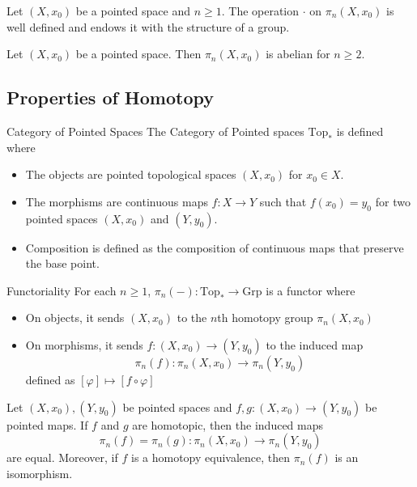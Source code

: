 \documentclass[a4paper]{article}
\begin{document}
\begin{thm}{}{} Let $(X,x_0)$ be a pointed space and $n\geq 1$. The operation $\cdot$ on $\pi_n(X,x_0)$ is well defined and endows it with the structure of a group. 
\end{thm}

\begin{prp}{}{} Let $(X,x_0)$ be a pointed space. Then $\pi_n(X,x_0)$ is abelian for $n\geq 2$. 
\end{prp}

\subsection{Properties of Homotopy}
\begin{defn}{Category of Pointed Spaces}{} The Category of Pointed spaces $\text{Top}_\ast$ is defined where 
\begin{itemize}
\item The objects are pointed topological spaces $(X,x_0)$ for $x_0\in X$. 
\item The morphisms are continuous maps $f:X\to Y$ such that $f(x_0)=y_0$ for two pointed spaces $(X,x_0)$ and $(Y,y_0)$. 
\item Composition is defined as the composition of continuous maps that preserve the base point. 
\end{itemize}
\end{defn}

\begin{prp}{Functoriality}{} For each $n\geq 1$, $\pi_n(-):\text{Top}_\ast\to\text{Grp}$ is a functor where 
\begin{itemize}
\item On objects, it sends $(X,x_0)$ to the $n$th homotopy group $\pi_n(X,x_0)$
\item On morphisms, it sends $f:(X,x_0)\to (Y,y_0)$ to the induced map $$\pi_n(f):\pi_n(X,x_0)\to\pi_n(Y,y_0)$$ defined as $[\varphi]\mapsto[f\circ\varphi]$
\end{itemize}
\end{prp}

\begin{prp}{}{} Let $(X,x_0),(Y,y_0)$ be pointed spaces and $f,g:(X,x_0)\to (Y,y_0)$ be pointed maps. If $f$ and $g$ are homotopic, then the induced maps $$\pi_n(f)=\pi_n(g):\pi_n(X,x_0)\to\pi_n(Y,y_0)$$ are equal. Moreover, if $f$ is a homotopy equivalence, then $\pi_n(f)$ is an isomorphism. 
\end{prp}
\end{document}
